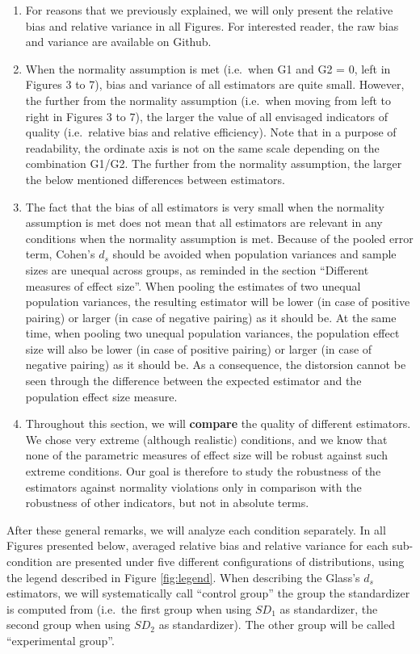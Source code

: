 \documentclass[
  man,floatsintext]{apa6}
\begin{document}
\begin{enumerate}
\def\labelenumi{\arabic{enumi})}
\item
  For reasons that we previously explained, we will only present the relative bias and relative variance in all Figures. For interested reader, the raw bias and variance are available on Github.
\item
  When the normality assumption is met (i.e.~when G1 and G2 = 0, left in Figures 3 to 7), bias and variance of all estimators are quite small. However, the further from the normality assumption (i.e.~when moving from left to right in Figures 3 to 7), the larger the value of all envisaged indicators of quality (i.e.~relative bias and relative efficiency). Note that in a purpose of readability, the ordinate axis is not on the same scale depending on the combination G1/G2. The further from the normality assumption, the larger the below mentioned differences between estimators.
\item
  The fact that the bias of all estimators is very small when the normality assumption is met does not mean that all estimators are relevant in any conditions when the normality assumption is met. Because of the pooled error term, Cohen's \(d_s\) should be avoided when population variances and sample sizes are unequal across groups, as reminded in the section \enquote{Different measures of effect size}. When pooling the estimates of two unequal population variances, the resulting estimator will be lower (in case of positive pairing) or larger (in case of negative pairing) as it should be. At the same time, when pooling two unequal population variances, the population effect size will also be lower (in case of positive pairing) or larger (in case of negative pairing) as it should be. As a consequence, the distorsion cannot be seen through the difference between the expected estimator and the population effect size measure.
\item
  Throughout this section, we will \textbf{compare} the quality of different estimators. We chose very extreme (although realistic) conditions, and we know that none of the parametric measures of effect size will be robust against such extreme conditions. Our goal is therefore to study the robustness of the estimators against normality violations only in comparison with the robustness of other indicators, but not in absolute terms.
\end{enumerate}

After these general remarks, we will analyze each condition separately. In all Figures presented below, averaged relative bias and relative variance for each sub-condition are presented under five different configurations of distributions, using the legend described in Figure \ref{fig:legend}. When describing the Glass's \(d_s\) estimators, we will systematically call \enquote{control group} the group the standardizer is computed from (i.e.~the first group when using \(SD_1\) as standardizer, the second group when using \(SD_2\) as standardizer). The other group will be called \enquote{experimental group}.
\end{document}
